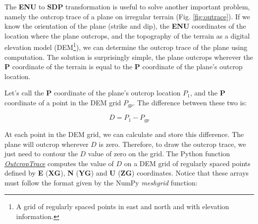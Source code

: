 \documentclass[a4paper , 12pt]{book}
\begin{document}
The \textbf{ENU} to \textbf{SDP} transformation is useful to solve another important problem, namely the outcrop trace of a plane on irregular terrain (Fig. \ref{fig:outrace}). If we know the orientation of the plane (strike and dip), the \textbf{ENU} coordinates of the location where the plane outcrops, and the topography of the terrain as a digital elevation model (DEM\footnote{A grid of regularly spaced points in east and north and with elevation information.}), we can determine the outcrop trace of the plane using computation. The solution is surprisingly simple, the plane outcrops wherever the \textbf{P} coordinate of the terrain is equal to the \textbf{P} coordinate of the plane's outcrop location.

Let's call the \textbf{P} coordinate of the plane's outcrop location $P_1$, and the \textbf{P} coordinate of a point in the DEM grid $P_{gp}$. The difference between these two is:

\begin{equation}
    D=P_1-P_{gp}
\end{equation}

At each point in the DEM grid, we can calculate and store this difference. The plane will outcrop wherever $D$ is zero. Therefore, to draw the outcrop trace, we just need to contour the $D$ value of zero on the grid. The Python function \href{http://github.com}{\textit{OutcropTrace}} computes the value of $D$ on a DEM grid of regularly spaced points defined by \textbf{E} ($\mathbf{XG}$), \textbf{N} ($\mathbf{YG}$) and \textbf{U} ($\mathbf{ZG}$) coordinates. Notice that these arrays must follow the format given by the NumPy \textit{meshgrid} function:
\end{document}
